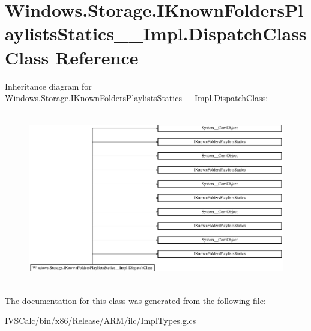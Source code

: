 \hypertarget{class_windows_1_1_storage_1_1_i_known_folders_playlists_statics_____impl_1_1_dispatch_class}{}\section{Windows.\+Storage.\+I\+Known\+Folders\+Playlists\+Statics\+\_\+\+\_\+\+Impl.\+Dispatch\+Class Class Reference}
\label{class_windows_1_1_storage_1_1_i_known_folders_playlists_statics_____impl_1_1_dispatch_class}
Inheritance diagram for Windows.\+Storage.\+I\+Known\+Folders\+Playlists\+Statics\+\_\+\+\_\+\+Impl.\+Dispatch\+Class\+:\begin{figure}[H]
\begin{center}
\leavevmode
\includegraphics[height=7.530562cm]{class_windows_1_1_storage_1_1_i_known_folders_playlists_statics_____impl_1_1_dispatch_class}
\end{center}
\end{figure}


The documentation for this class was generated from the following file\+:\begin{DoxyCompactItemize}
\item 
I\+V\+S\+Calc/bin/x86/\+Release/\+A\+R\+M/ilc/Impl\+Types.\+g.\+cs\end{DoxyCompactItemize}
